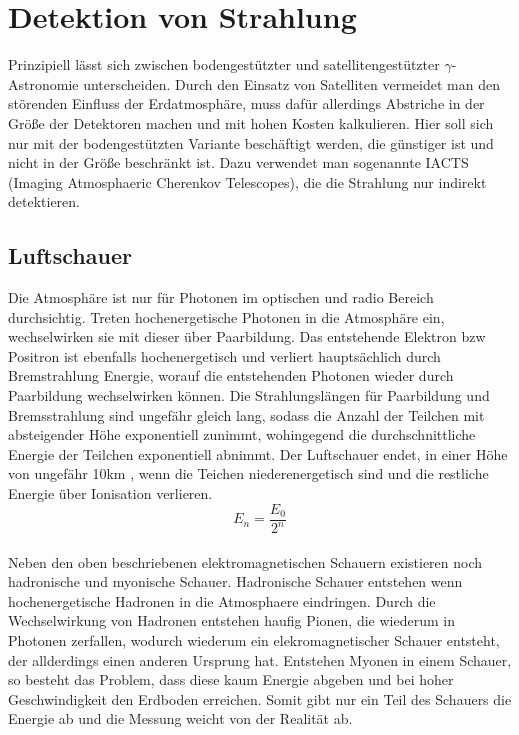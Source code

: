 \section{Detektion von Strahlung}
Prinzipiell lässt sich zwischen bodengestützter und satellitengestützter $\gamma$-Astronomie unterscheiden. Durch den Einsatz von Satelliten vermeidet man den störenden Einfluss der Erdatmosphäre, muss dafür allerdings Abstriche in der Größe der Detektoren machen und mit hohen Kosten kalkulieren. Hier soll sich nur mit der bodengestützten Variante beschäftigt werden, die günstiger ist und nicht in der Größe beschränkt ist. Dazu verwendet man sogenannte IACTS (Imaging Atmosphaeric Cherenkov Telescopes), die die Strahlung nur indirekt detektieren.

\subsection{Luftschauer}
Die Atmosphäre ist nur für Photonen im optischen und radio Bereich durchsichtig. Treten hochenergetische Photonen in die Atmosphäre ein, wechselwirken sie mit dieser über Paarbildung. Das entstehende Elektron bzw Positron ist ebenfalls hochenergetisch und verliert hauptsächlich durch Bremstrahlung Energie, worauf die entstehenden Photonen wieder durch Paarbildung wechselwirken können. Die Strahlungslängen für Paarbildung und Bremsstrahlung sind ungefähr gleich lang, sodass die Anzahl der Teilchen mit absteigender Höhe exponentiell zunimmt, wohingegend die durchschnittliche Energie der Teilchen exponentiell abnimmt. Der Luftschauer endet, in einer Höhe von ungefähr 10km 
\cite{iwas}, wenn die Teichen niederenergetisch sind und die restliche Energie über Ionisation verlieren.
\begin{equation}
E_n=\frac{E_0}{2^n}
\end{equation}\\
Neben den oben beschriebenen elektromagnetischen Schauern existieren noch hadronische und myonische Schauer. Hadronische Schauer entstehen wenn hochenergetische Hadronen in die Atmosphaere eindringen. Durch die Wechselwirkung von Hadronen entstehen haufig Pionen, die wiederum in Photonen zerfallen, wodurch wiederum ein elekromagnetischer Schauer entsteht, der allderdings einen anderen Ursprung hat. Entstehen Myonen in einem Schauer, so besteht das Problem, dass diese kaum Energie abgeben und bei hoher Geschwindigkeit den Erdboden erreichen. Somit gibt nur ein Teil des Schauers die Energie ab und die Messung weicht von der Realität ab.

